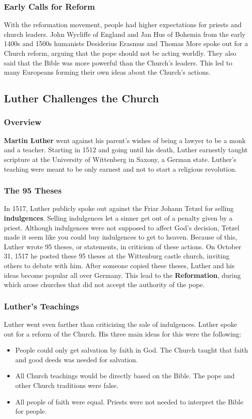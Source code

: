 \documentclass[11pt]{article}
\begin{document}
\subsubsection{Early Calls for Reform}
\label{sec:orgf3ccbd4}
With the reformation movement, people had higher expectations for priests and church leaders. John Wycliffe of England and Jan Hus of Bohemia from the early 1400s and 1500s humanists Desiderius Erasmus and Thomas More spoke out for a Church reform, arguing that the pope should not be acting worldly. They also said that the Bible was more powerful than the Church's leaders. This led to many Europeans forming their own ideas about the Church's actions.
\subsection{Luther Challenges the Church}
\label{sec:org099fba1}
\subsubsection{Overview}
\label{sec:org4c99048}
\textbf{Martin Luther} went against his parent's wishes of being a lawyer to be a monk and a teacher. Starting in 1512 and going until his death, Luther earnestly taught scripture at the University of Wittenberg in Saxony, a German state. Luther's teaching were meant to be only earnest and not to start a religious revolution.
\subsubsection{The 95 Theses}
\label{sec:orgf282005}
In 1517, Luther publicly spoke out against the Friar Johann Tetzel for selling \textbf{indulgences}. Selling indulgences let a sinner get out of a penalty given by a priest. Although indulgences were not supposed to affect God's decision, Tetzel made it seem like you could buy indulgences to get to heaven. Because of this, Luther wrote 95 theses, or statements, in criticism of these actions. On October 31, 1517 he posted these 95 theses at the Wittenburg castle church, inviting others to debate with him. After someone copied these theses, Luther and his ideas become popular all over Germany. This lead to the \textbf{Reformation}, during which arose churches that did not accept the authority of the pope.
\subsubsection{Luther's Teachings}
\label{sec:orgbdbdea2}
Luther went even farther than criticizing the sale of indulgences. Luther spoke out for a reform of the Church. His three main ideas for this were the following:
\begin{itemize}
\item People could only get salvation by faith in God. The Church taught that faith and good deeds was needed for salvation.
\item All Church teachings would be directly based on the Bible. The pope and other Church traditions were false.
\item All people of faith were equal. Priests were not needed to interpret the Bible for people.
\end{itemize}
\end{document}
